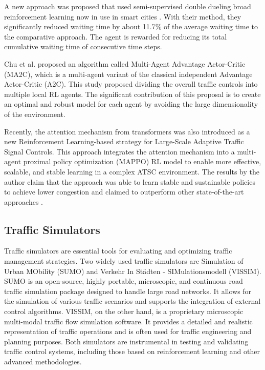 A new approach was proposed that used semi-supervised double dueling broad reinforcement learning now in use in smart cities \cite{tang2020semi}. With their method, they significantly reduced waiting time by about 11.7\% of the average waiting time to the comparative approach. The agent is rewarded for reducing its total cumulative waiting time of consecutive time steps.

Chu et al. proposed an algorithm called Multi-Agent Advantage Actor-Critic (MA2C), which is a multi-agent variant of the classical independent Advantage Actor-Critic (A2C). This study proposed dividing the overall traffic controls into multiple local RL agents. The significant contribution of this proposal is to create an optimal and robust model for each agent by avoiding the large dimensionality of the environment. \cite{chu_multi-agent_2020}

Recently, the attention mechanism from transformers was also introduced as a new Reinforcement Learning-based strategy for Large-Scale Adaptive Traffic Signal Controls. This approach integrates the attention mechanism into a multi-agent proximal policy optimization (MAPPO) RL model to enable more effective, scalable, and stable learning in a complex ATSC environment. The results by the author claim that the approach was able to learn stable and sustainable policies to achieve lower congestion and claimed to outperform other state-of-the-art approaches \cite{han_attention_2024}.

\subsection{Traffic Simulators}
Traffic simulators are essential tools for evaluating and optimizing traffic management strategies. Two widely used traffic simulators are Simulation of Urban MObility (SUMO) and Verkehr In Städten - SIMulationsmodell (VISSIM). SUMO is an open-source, highly portable, microscopic, and continuous road traffic simulation package designed to handle large road networks. It allows for the simulation of various traffic scenarios and supports the integration of external control algorithms. VISSIM, on the other hand, is a proprietary microscopic multi-modal traffic flow simulation software. It provides a detailed and realistic representation of traffic operations and is often used for traffic engineering and planning purposes. Both simulators are instrumental in testing and validating traffic control systems, including those based on reinforcement learning and other advanced methodologies.
